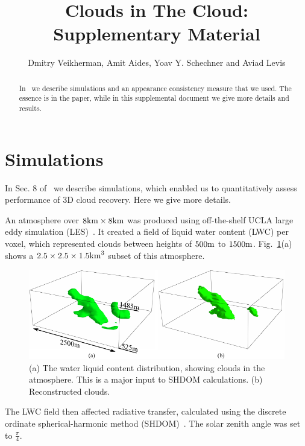 \documentclass[runningheads]{llncs}
\begin{document}
\pagestyle{headings}
\mainmatter

\title{Clouds in The Cloud:\\
Supplementary Material}


\author{Dmitry Veikherman, Amit Aides, Yoav Y. Schechner and Aviad Levis}

\maketitle
\begin{abstract}
In~\cite{danny2014} we describe simulations and an appearance consistency measure that we used. The essence is in the paper, while in this supplemental document we give more details and results.

\end{abstract}

\section{Simulations}

In Sec. 8 of~\cite{danny2014} we describe simulations, which enabled us to quantitatively assess performance of 3D cloud recovery. Here we give more details.

An atmosphere over $8{\rm km}\times 8{\rm km}$  was produced using off-the-shelf UCLA large eddy simulation (LES)~\cite{stevens_evaluation_2005}. It created a field of liquid water content (LWC) per voxel, which represented clouds between heights of $500{\rm m}$ to $1500{\rm m}$. Fig.~\ref{fig:simulation_imgs2}(a) shows a $2.5\times 2.5\times 1.5{\rm km}^3$ subset of this atmosphere.
\begin{figure}
  \begin{center}
    \includegraphics{figures/clouds3d_SHDOM}
    \caption{(a) The water liquid content distribution, showing clouds in the atmosphere.
     This is a major input to SHDOM calculations. (b)
      Reconstructed clouds.}
    \label{fig:simulation_imgs2}
  \end{center}
\end{figure}
The LWC field then affected radiative transfer, calculated using the discrete ordinate spherical-harmonic method (SHDOM)~\cite{Evans1998}. The solar zenith angle was set to $\frac{\pi}{4}$.
\end{document}
